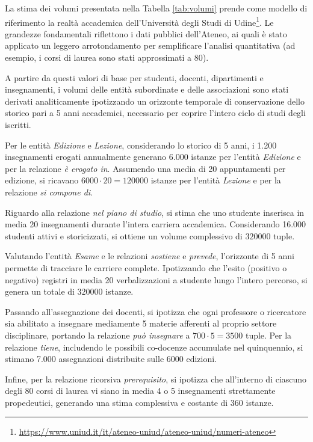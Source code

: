 La stima dei volumi presentata nella Tabella \ref{tab:volumi} prende come modello di riferimento la realtà accademica dell'Università degli Studi di Udine\footnote{\url{https://www.uniud.it/it/ateneo-uniud/ateneo-uniud/numeri-ateneo}}. Le grandezze fondamentali riflettono i dati pubblici dell'Ateneo, ai quali è stato applicato un leggero arrotondamento per semplificare l'analisi quantitativa (ad esempio, i corsi di laurea sono stati approssimati a 80). 

A partire da questi valori di base per studenti, docenti, dipartimenti e insegnamenti, i volumi delle entità subordinate e delle associazioni sono stati derivati analiticamente ipotizzando un orizzonte temporale di conservazione dello storico pari a 5 anni accademici, necessario per coprire l'intero ciclo di studi degli iscritti.

Per le entità \textit{Edizione} e \textit{Lezione}, considerando lo storico di 5 anni, i 1.200 insegnamenti erogati annualmente generano 6.000 istanze per l'entità \textit{Edizione} e per la relazione \textit{è erogato in}. Assumendo una media di 20 appuntamenti per edizione, si ricavano $6000 \cdot 20 = 120000$ istanze per l'entità \textit{Lezione} e per la relazione \textit{si compone di}.

Riguardo alla relazione \textit{nel piano di studio}, si stima che uno studente inserisca in media 20 insegnamenti durante l'intera carriera accademica. Considerando 16.000 studenti attivi e storicizzati, si ottiene un volume complessivo di $320000$ tuple.

Valutando l'entità \textit{Esame} e le relazioni \textit{sostiene} e \textit{prevede}, l'orizzonte di 5 anni permette di tracciare le carriere complete. Ipotizzando che l'esito (positivo o negativo) registri in media 20 verbalizzazioni a studente lungo l'intero percorso, si genera un totale di $320000$ istanze.

Passando all'assegnazione dei docenti, si ipotizza che ogni professore o ricercatore sia abilitato a insegnare mediamente 5 materie afferenti al proprio settore disciplinare, portando la relazione \textit{può insegnare} a $700 \cdot 5 = 3500$ tuple. Per la relazione \textit{tiene}, includendo le possibili co-docenze accumulate nel quinquennio, si stimano 7.000 assegnazioni distribuite sulle $6000$ edizioni.

Infine, per la relazione ricorsiva \textit{prerequisito}, si ipotizza che all'interno di ciascuno degli 80 corsi di laurea vi siano in media 4 o 5 insegnamenti strettamente propedeutici, generando una stima complessiva e costante di 360 istanze.

